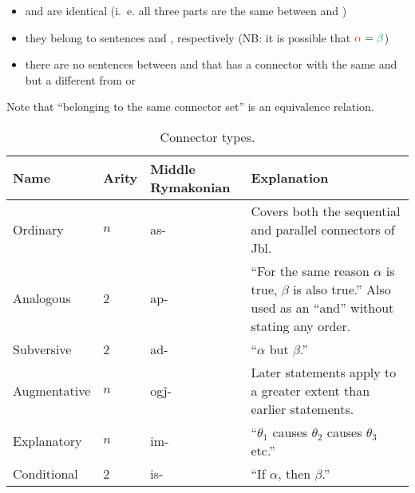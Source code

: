 \documentclass{book}
\newcommand{\lname}{Middle Rymakonian}
\begin{document}
\begin{itemize}
  \item {} and  are identical (i.~e. all three parts are the same between  and )
  \item they belong to sentences \hlv{$\alpha$} and \hlvi{$\beta$}, respectively (NB: it is possible that $\hlv{\alpha} = \hlvi{\beta}$)
  \item there are no sentences between \hlv{$\alpha$} and \hlvi{$\beta$} that has a connector with the same  and  but a different  from  or 
\end{itemize}

Note that ``belonging to the same connector set'' is an equivalence relation.

\begin{table}[ht]
  \caption{Connector types. \label{table:contypes}}
  \centering
  \begin{tabu} to 
    Name & Arity & \textnormal{\lname} & Explanation \\
    \hline
    Ordinary & $n$ & as- & Covers both the sequential and parallel connectors of Jbl. \\
    Analogous & 2 & ap- & ``For the same reason $\alpha$ is true, $\beta$ is also true.'' Also used as an ``and'' without stating any order. \\
    Subversive & 2 & ad- & ``$\alpha$ but $\beta$.'' \\
    Augmentative & $n$ & og\^j- & Later statements apply to a greater extent than earlier statements. \\
    Explanatory & $n$ & im- & ``$\theta_1$ causes $\theta_2$ causes $\theta_3$ etc.'' \\
    Conditional & 2 & is- & ``If $\alpha$, then $\beta$.'' \\
  \end{tabu}
\end{table}
\end{document}
